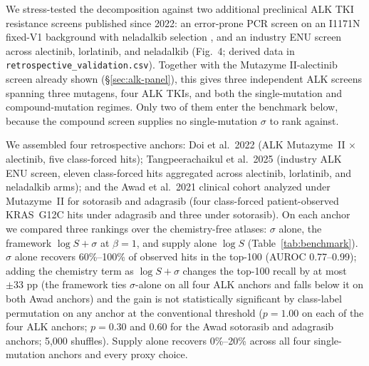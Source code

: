 \documentclass[11pt,a4paper]{article}
\begin{document}
We stress-tested the decomposition against two additional preclinical
ALK TKI resistance screens published since 2022: an error-prone PCR
screen on an I1171N fixed-V1 background with neladalkib selection
\citep{takei2025}, and an industry ENU screen across alectinib,
lorlatinib, and neladalkib \citep{tangpeerachaikul2025} (Fig.~4;
derived data in \texttt{retrospective\_validation.csv}). Together with
the Mutazyme II-alectinib screen \citep{doi2022} already shown
(\S\ref{sec:alk-panel}), this gives three independent ALK screens
spanning three mutagens, four ALK TKIs, and both the single-mutation
and compound-mutation regimes. Only two of them enter the benchmark
below, because the compound screen supplies no single-mutation
$\sigma$ to rank against.

We assembled four retrospective anchors: Doi et al.\ 2022
\citep{doi2022} (ALK Mutazyme~II $\times$ alectinib, five class-forced
hits); Tangpeerachaikul et al.\ 2025 \citep{tangpeerachaikul2025}
(industry ALK ENU screen, eleven class-forced hits aggregated across
alectinib, lorlatinib, and neladalkib arms); and the Awad et al.\ 2021
clinical cohort \citep{awad2021} analyzed under Mutazyme~II for
sotorasib and adagrasib (four class-forced patient-observed KRAS~G12C
hits under adagrasib and three under sotorasib). On each anchor we compared three rankings over the
chemistry-free atlases: $\sigma$ alone, the framework
$\log S + \sigma$ at $\beta=1$, and supply alone $\log S$
(Table~\ref{tab:benchmark}). $\sigma$ alone
recovers 60\%--100\% of observed hits in the top-100 (AUROC
0.77--0.99); adding the chemistry term as $\log S + \sigma$ changes
the top-100 recall by at most $\pm 33$ pp (the framework ties
$\sigma$-alone on all four ALK anchors and falls below it on both Awad
anchors) and the gain is not statistically
significant by class-label permutation on any anchor at the conventional
threshold ($p = 1.00$ on each of the four ALK anchors; $p = 0.30$ and
$0.60$ for the Awad sotorasib
and adagrasib anchors; 5{,}000 shuffles). Supply alone recovers
0\%--20\% across all four single-mutation anchors and every proxy
choice.
\end{document}
